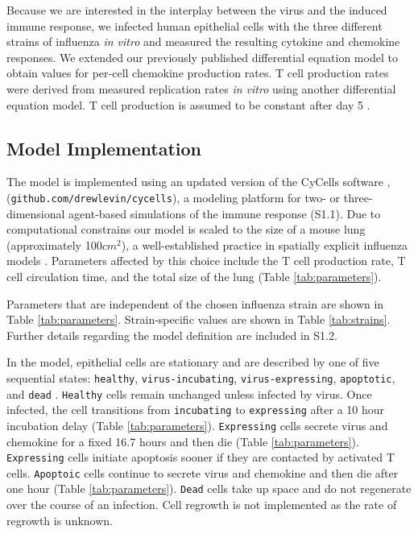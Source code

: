 \documentclass[preprint,10pt,numbers]{elsarticle}
\newcommand{\removed}[1]{}
\newcommand{\new}[1]{#1}
\begin{document}
Because we are interested in the interplay between the virus and the induced immune response, we infected human epithelial cells with the three different strains of influenza \textit{in vitro} and measured the resulting cytokine and chemokine responses.  We extended \removed{a}\new{our} previously published differential equation model \citep{Mitchell2011} to obtain values for per-cell chemokine production rates.  T cell production rates were derived from measured replication rates \textit{in vitro} \citep{Miao2010a} using another differential equation model. T cell production is assumed to be constant after day 5 \citep{MartIn-Fontecha2003}.  

\subsection*{Model Implementation}

The model is implemented using an updated version of the CyCells software \citep{Warrender2006},
(\texttt{github.com/drewlevin/cycells}),
a modeling platform for two- or three-dimensional agent-based simulations of the immune response (S1.1).  Due to computational constrains our model is scaled to the size of a mouse lung (approximately 100$cm^2$), a well-established practice in spatially explicit influenza models \citep{Miller2003, Allan2006, Ingulli2009}.  Parameters affected by this choice include the T cell production rate, T cell circulation time, and the total size of the lung (Table \ref{tab:parameters}).

Parameters that are independent of the chosen influenza strain are shown in Table \ref{tab:parameters}.  Strain-specific values are shown in Table \ref{tab:strains}.  Further details regarding the model definition are included in S1.2.

In the model, epithelial cells are stationary and are described by one of five sequential states: \texttt{healthy}, \texttt{virus-incubating}, \texttt{virus-expressing}, \texttt{apoptotic}, and \texttt{dead} \citep{bachem1996simulated, Beauchemin2005, Mitchell2011}. \texttt{Healthy} cells remain unchanged unless infected by virus. Once infected, the cell transitions from \texttt{incubating} to \texttt{expressing} after a 10 hour incubation delay (Table \ref{tab:parameters}). \texttt{Expressing} cells secrete virus and chemokine for a fixed 16.7 hours and then die (Table \ref{tab:parameters}). \texttt{Expressing} cells initiate apoptosis sooner if they are contacted by activated T cells. \texttt{Apoptoic} cells continue to secrete virus and chemokine and then die after one hour (Table \ref{tab:parameters}). \texttt{Dead} cells take up space and do not regenerate over the course of an infection.  Cell regrowth is not implemented as the rate of regrowth is unknown. 
\end{document}
